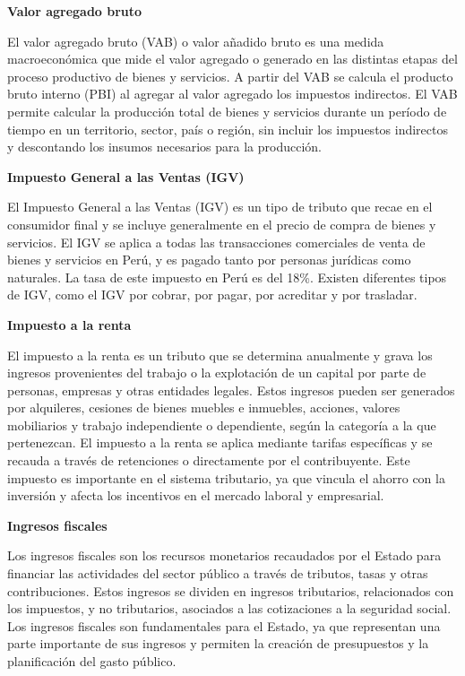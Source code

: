 \documentclass[
  letterpaper,
]{article}
\begin{document}
\textbf{Valor agregado bruto}

El valor agregado bruto (VAB) o valor añadido bruto es una medida
macroeconómica que mide el valor agregado o generado en las distintas
etapas del proceso productivo de bienes y servicios. A partir del VAB se
calcula el producto bruto interno (PBI) al agregar al valor agregado los
impuestos indirectos. El VAB permite calcular la producción total de
bienes y servicios durante un período de tiempo en un territorio,
sector, país o región, sin incluir los impuestos indirectos y
descontando los insumos necesarios para la producción.

\textbf{Impuesto General a las Ventas (IGV)}

El Impuesto General a las Ventas (IGV) es un tipo de tributo que recae
en el consumidor final y se incluye generalmente en el precio de compra
de bienes y servicios. El IGV se aplica a todas las transacciones
comerciales de venta de bienes y servicios en Perú, y es pagado tanto
por personas jurídicas como naturales. La tasa de este impuesto en Perú
es del 18\%. Existen diferentes tipos de IGV, como el IGV por cobrar,
por pagar, por acreditar y por trasladar.

\textbf{Impuesto a la renta}

El impuesto a la renta es un tributo que se determina anualmente y grava
los ingresos provenientes del trabajo o la explotación de un capital por
parte de personas, empresas y otras entidades legales. Estos ingresos
pueden ser generados por alquileres, cesiones de bienes muebles e
inmuebles, acciones, valores mobiliarios y trabajo independiente o
dependiente, según la categoría a la que pertenezcan. El impuesto a la
renta se aplica mediante tarifas específicas y se recauda a través de
retenciones o directamente por el contribuyente. Este impuesto es
importante en el sistema tributario, ya que vincula el ahorro con la
inversión y afecta los incentivos en el mercado laboral y empresarial.

\textbf{Ingresos fiscales}

Los ingresos fiscales son los recursos monetarios recaudados por el
Estado para financiar las actividades del sector público a través de
tributos, tasas y otras contribuciones. Estos ingresos se dividen en
ingresos tributarios, relacionados con los impuestos, y no tributarios,
asociados a las cotizaciones a la seguridad social. Los ingresos
fiscales son fundamentales para el Estado, ya que representan una parte
importante de sus ingresos y permiten la creación de presupuestos y la
planificación del gasto público.
\end{document}
